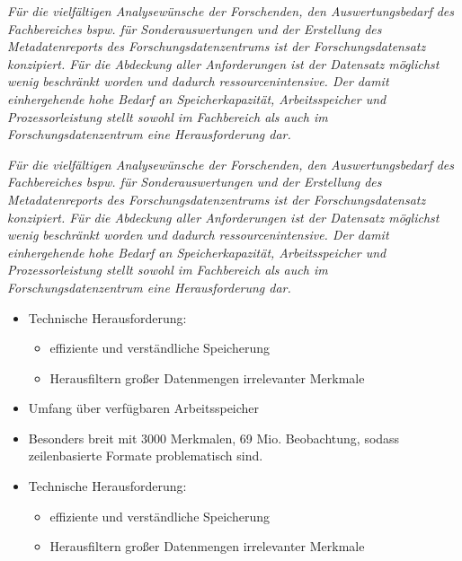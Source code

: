 \documentclass[
  german,
  10pt,
  twoside]{article}
\providecommand{\tightlist}{%
  \setlength{\itemsep}{0pt}\setlength{\parskip}{0pt}}
\begin{document}
\emph{Für die vielfältigen Analysewünsche der Forschenden, den
Auswertungsbedarf des Fachbereiches bspw. für Sonderauswertungen und der
Erstellung des Metadatenreports des Forschungsdatenzentrums ist der
Forschungsdatensatz konzipiert. Für die Abdeckung aller Anforderungen
ist der Datensatz möglichst wenig beschränkt worden und dadurch
ressourcenintensive. Der damit einhergehende hohe Bedarf an
Speicherkapazität, Arbeitsspeicher und Prozessorleistung stellt sowohl
im Fachbereich als auch im Forschungsdatenzentrum eine Herausforderung
dar.}

\emph{Für die vielfältigen Analysewünsche der Forschenden, den
Auswertungsbedarf des Fachbereiches bspw. für Sonderauswertungen und der
Erstellung des Metadatenreports des Forschungsdatenzentrums ist der
Forschungsdatensatz konzipiert. Für die Abdeckung aller Anforderungen
ist der Datensatz möglichst wenig beschränkt worden und dadurch
ressourcenintensive. Der damit einhergehende hohe Bedarf an
Speicherkapazität, Arbeitsspeicher und Prozessorleistung stellt sowohl
im Fachbereich als auch im Forschungsdatenzentrum eine Herausforderung
dar.}

\begin{itemize}
\item
  Technische Herausforderung:

  \begin{itemize}
  \tightlist
  \item
    effiziente und verständliche Speicherung
  \item
    Herausfiltern großer Datenmengen irrelevanter Merkmale
  \end{itemize}
\item
  Umfang über verfügbaren Arbeitsspeicher
\item
  Besonders breit mit 3000 Merkmalen, 69 Mio. Beobachtung, sodass
  zeilenbasierte Formate problematisch sind.
\item
  Technische Herausforderung:

  \begin{itemize}
  \tightlist
  \item
    effiziente und verständliche Speicherung
  \item
    Herausfiltern großer Datenmengen irrelevanter Merkmale
  \end{itemize}
\end{itemize}


\printbibliography
\end{document}
